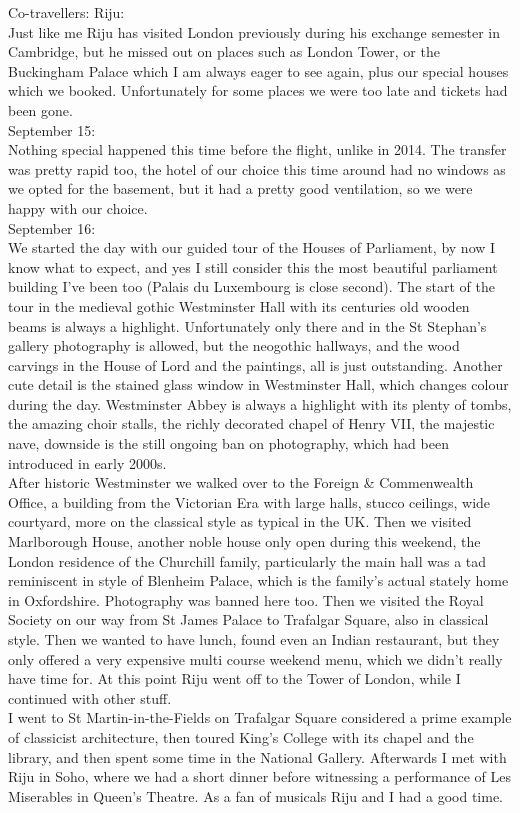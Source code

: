 Co-travellers: Riju:\\
Just like me Riju has visited London previously during his exchange semester in Cambridge, but he missed out on places such as London Tower, or the Buckingham Palace which I am always eager to see again, plus our special houses which we booked. Unfortunately for some places we were too late and tickets had been gone.\\

September 15:\\
Nothing special happened this time before the flight, unlike in 2014. The transfer was pretty rapid too, the hotel of our choice this time around had no windows as we opted for the basement, but it had a pretty good ventilation, so we were happy with our choice.\\

September 16:\\
We started the day with our guided tour of the Houses of Parliament, by now I know what to expect, and yes I still consider this the most beautiful parliament building I've been too (Palais du Luxembourg is close second). The start of the tour in the medieval gothic Westminster Hall with its centuries old wooden beams is always a highlight. Unfortunately only there and in the St Stephan's gallery photography is allowed, but the neogothic hallways, and the wood carvings in the House of Lord and the paintings, all is just outstanding. Another cute detail is the stained glass window in Westminster Hall, which changes colour during the day. Westminster Abbey is always a highlight with its plenty of tombs, the amazing choir stalls, the richly decorated chapel of Henry VII, the majestic nave, downside is the still ongoing ban on photography, which had been introduced in early 2000s.\\
After historic Westminster we walked over to the Foreign \& Commenwealth Office, a building from the Victorian Era with large halls, stucco ceilings, wide courtyard, more on the classical style as typical in the UK. Then we visited Marlborough House, another noble house only open during this weekend, the London residence of the Churchill family, particularly the main hall was a tad reminiscent in style of Blenheim Palace, which is the family's actual stately home in Oxfordshire. Photography was banned here too. Then we visited the Royal Society on our way from St James Palace to Trafalgar Square, also in classical style. Then we wanted to have lunch, found even an Indian restaurant, but they only offered a very expensive multi course weekend menu, which we didn't really have time for. At this point Riju went off to the Tower of London, while I continued with other stuff.  \\
I went to St Martin-in-the-Fields on Trafalgar Square considered a prime example of classicist architecture, then toured King's College with its chapel and the library, and then spent some time in the National Gallery. Afterwards I met with Riju in Soho, where we had a short dinner before witnessing a performance of Les Miserables in Queen's Theatre. As a fan of musicals Riju and I had a good time.\\

